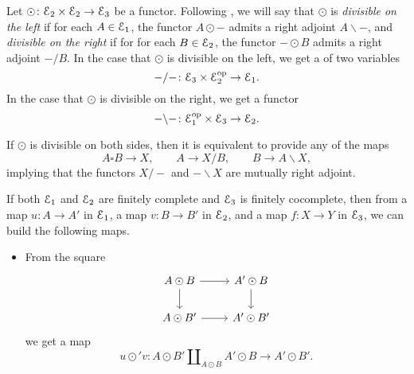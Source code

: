 \documentclass[main.tex]{subfiles}
\begin{document}
\begin{appendix}
  Let $\odot\colon \mathcal{E}_{2} \times \mathcal{E}_{2} \to \mathcal{E}_{3}$ be a functor. Following \cite{qcats_vs_segal_spaces}, we will say that $\odot$ is \emph{divisible on the left} if for each $A \in \mathcal{E}_{1}$, the functor $A \odot -$ admits a right adjoint $A \backslash -$, and \emph{divisible on the right} if for for each $B \in \mathcal{E}_{2}$, the functor $- \odot B$ admits a right adjoint $- / B$. In the case that $\odot$ is divisible on the left, we get a of two variables
  \begin{equation*}
    - / -\colon \mathcal{E}_{3} \times \mathcal{E}_{2}^{\mathrm{op}} \to \mathcal{E}_{1}.
  \end{equation*}
  In the case that $\odot$ is divisible on the right, we get a functor
  \begin{equation*}
    - \backslash -\colon \mathcal{E}_{1}^{\mathrm{op}} \times \mathcal{E}_{3} \to \mathcal{E}_{2}.
  \end{equation*}

  If $\odot$ is divisible on both sides, then it is equivalent to provide any of the maps
  \begin{equation*}
    A \square B \to X,\qquad A \to X / B,\qquad B \to A \backslash X,
  \end{equation*}
  implying that the functors $X / -$ and $- \backslash X$ are mutually right adjoint.

  If both $\mathcal{E}_{1}$ and $\mathcal{E}_{2}$ are finitely complete and $\mathcal{E}_{3}$ is finitely cocomplete, then from a map $u\colon A \to A'$ in $\mathcal{E}_{1}$, a map $v\colon B \to B'$ in $\mathcal{E}_{2}$, and a map $f\colon X \to Y$ in $\mathcal{E}_{3}$, we can build the following maps.
  \begin{itemize}
    \item From the square
      \begin{equation*}
        \begin{tikzcd}
          A \odot B
          \arrow[r]
          \arrow[d]
          & A' \odot B
          \arrow[d]
          \\
          A \odot B'
          \arrow[r]
          & A' \odot B'
        \end{tikzcd}
      \end{equation*}
      we get a map
      \begin{equation*}
        u \odot' v\colon A \odot B' \amalg_{A \odot B} A' \odot B \to A' \odot B'.
      \end{equation*}


\end{itemize}
\end{appendix}
\end{document}
